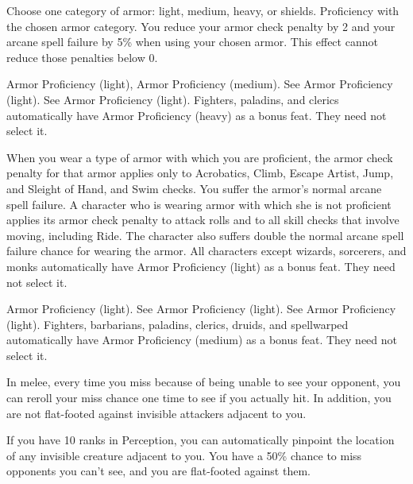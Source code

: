 Choose one category of armor: light, medium, heavy, or shields.
 Proficiency with the chosen armor category.
 You reduce your armor check penalty by 2 and your arcane spell failure by 5\% when using your chosen armor. This effect cannot reduce those penalties below 0.

 Armor Proficiency (light), Armor Proficiency (medium).
 See Armor Proficiency (light).
 See Armor Proficiency (light).
 Fighters, paladins, and clerics automatically have Armor Proficiency (heavy) as a bonus feat. They need not select it.

 When you wear a type of armor with which you are proficient, the armor check penalty for that armor applies only to Acrobatics, Climb, Escape Artist, Jump, and Sleight of Hand, and Swim checks. You suffer the armor's normal arcane spell failure.
 A character who is wearing armor with which she is not proficient applies its armor check penalty to attack rolls and to all skill checks that involve moving, including Ride. The character also suffers double the normal arcane spell failure chance for wearing the armor.
 All characters except wizards, sorcerers, and monks automatically have Armor Proficiency (light) as a bonus feat. They need not select it.

 Armor Proficiency (light).
 See Armor Proficiency (light).
 See Armor Proficiency (light).
 Fighters, barbarians, paladins, clerics, druids, and spellwarped automatically have Armor Proficiency (medium) as a bonus feat. They need not select it.


 In melee, every time you miss because of being unable to see your opponent, you can reroll your miss chance one time to see if you actually hit. In addition, you are not flat-footed against invisible attackers adjacent to you.
\par If you have 10 ranks in Perception, you can automatically pinpoint the location of any invisible creature adjacent to you. 
 You have a 50\% chance to miss opponents you can't see, and you are flat-footed against them.

